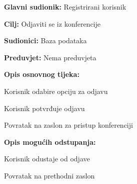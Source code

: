 					\noindent {}
					\begin{packed_item}
						
						\item \textbf{Glavni sudionik: } Registrirani korisnik
						\item  \textbf{Cilj:} Odjaviti se iz konferencije
						\item  \textbf{Sudionici:} Baza podataka
						\item  \textbf{Preduvjet:} Nema preduvjeta
						\item  \textbf{Opis osnovnog tijeka:}
						
						\item[] \begin{packed_enum}
							
							\item Korisnik odabire opciju za odjavu
							\item Korisnik potvrđuje odjavu
							\item Povratak na zaslon za pristup konferenciji
						\end{packed_enum}
						
						\item  \textbf{Opis mogućih odstupanja:}
						
						\item[] \begin{packed_item}
							
							\item[2.a] Korisnik odustaje od odjave
							\item[] \begin{packed_enum}
								
								\item Povratak na prethodni zaslon
								
							\end{packed_enum}
							
						\end{packed_item}
					\end{packed_item}
				

